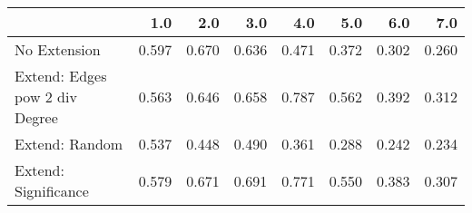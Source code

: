 \begin{tabular}{lrrrrrrr}
\toprule
{} &   1.0 &   2.0 &   3.0 &   4.0 &   5.0 &   6.0 &   7.0 \\
\midrule
No Extension                   & 0.597 & 0.670 & 0.636 & 0.471 & 0.372 & 0.302 & 0.260 \\
Extend: Edges pow 2 div Degree & 0.563 & 0.646 & 0.658 & 0.787 & 0.562 & 0.392 & 0.312 \\
Extend: Random                 & 0.537 & 0.448 & 0.490 & 0.361 & 0.288 & 0.242 & 0.234 \\
Extend: Significance           & 0.579 & 0.671 & 0.691 & 0.771 & 0.550 & 0.383 & 0.307 \\
\bottomrule
\end{tabular}

